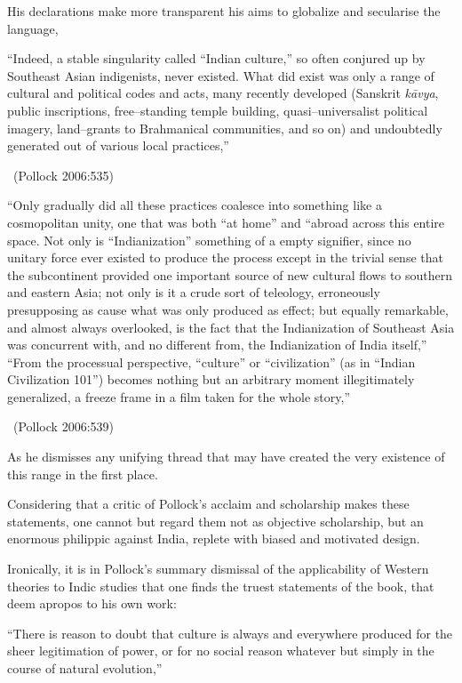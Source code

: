 His declarations make more transparent his aims to globalize and secularise the language,

\begin{myquote}
“Indeed, a stable singularity called “Indian culture,” so often conjured up by Southeast Asian indigenists, never existed. What did exist was only a range of cultural and political codes and acts, many recently developed (Sanskrit \textit{kāvya}, public inscriptions, free–standing temple building, quasi–universalist political imagery, land–grants to Brahmanical communities, and so on) and undoubtedly generated out of various local practices,” 

~\hfill (Pollock 2006:535)
\end{myquote}

\begin{myquote}
“Only gradually did all these practices coalesce into something like a cosmopolitan unity, one that was both “at home” and “abroad across this entire space. Not only is “Indianization” something of a empty signifier, since no unitary force ever existed to produce the process except in the trivial sense that the subcontinent provided one important source of new cultural flows to southern and eastern Asia; not only is it a crude sort of teleology, erroneously presupposing as cause what was only produced as effect; but equally remarkable, and almost always overlooked, is the fact that the Indianization of Southeast Asia was concurrent with, and no different from, the Indianization of India itself,” “From the processual perspective, “culture” or “civilization” (as in “Indian Civilization 101”) becomes nothing but an arbitrary moment illegitimately generalized, a freeze frame in a film taken for the whole story,” 

~\hfill (Pollock 2006:539) 
\end{myquote}

As he dismisses any unifying thread that may have created the very existence of this range in the first place.

Considering that a critic of Pollock’s acclaim and scholarship makes these statements, one cannot but regard them not as objective scholarship, but an enormous philippic against India, replete with biased and motivated design.

Ironically, it is in Pollock’s summary dismissal of the applicability of Western theories to Indic studies that one finds the truest statements of the book, that deem apropos to his own work:

\begin{myquote}
“There is reason to doubt that culture is always and everywhere produced for the sheer legitimation of power, or for no social reason whatever but simply in the course of natural evolution,”
\end{myquote}

